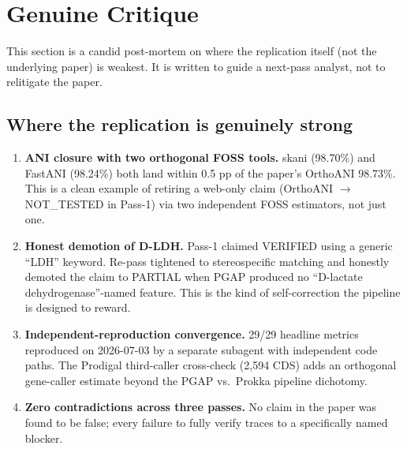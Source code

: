 \documentclass[11pt,letterpaper]{article}
\begin{document}
\section{Genuine Critique}
This section is a candid post-mortem on where the replication itself
(not the underlying paper) is weakest. It is written to guide a
next-pass analyst, not to relitigate the paper.

\subsection{Where the replication is genuinely strong}
\begin{enumerate}[leftmargin=1.4em]
\item \textbf{ANI closure with two orthogonal FOSS tools.} skani (98.70\%)
and FastANI (98.24\%) both land within 0.5 pp of the paper's OrthoANI
98.73\%. This is a clean example of retiring a web-only claim
(OrthoANI $\rightarrow$ NOT\_TESTED in Pass-1) via two independent
FOSS estimators, not just one.
\item \textbf{Honest demotion of D-LDH.} Pass-1 claimed VERIFIED using
a generic ``LDH'' keyword. Re-pass tightened to stereospecific matching
and honestly demoted the claim to PARTIAL when PGAP produced no
``D-lactate dehydrogenase''-named feature. This is the kind of
self-correction the pipeline is designed to reward.
\item \textbf{Independent-reproduction convergence.} 29/29 headline
metrics reproduced on 2026-07-03 by a separate subagent with
independent code paths. The Prodigal third-caller cross-check
(2{,}594 CDS) adds an orthogonal gene-caller estimate beyond the
PGAP vs.\ Prokka pipeline dichotomy.
\item \textbf{Zero contradictions across three passes.} No claim
in the paper was found to be false; every failure to fully verify
traces to a specifically named blocker.
\end{enumerate}
\end{document}
